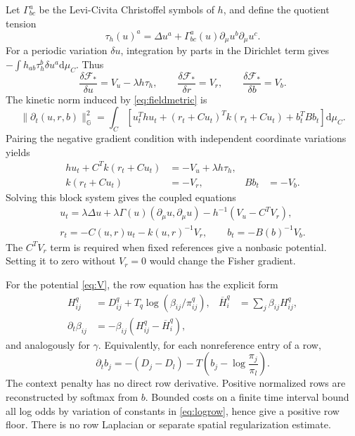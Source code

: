 \documentclass[11pt]{article}
\newcommand{\dd}{\mathrm d}
\begin{document}
Let $\Gamma^a_{bc}$ be the Levi-Civita Christoffel symbols of $h$, and define the quotient tension
\begin{equation}
 \tau_h(u)^a=\Delta u^a+
       \Gamma^a_{bc}(u)\partial_\mu u^b\partial_\mu u^c.
 \label{eq:tension}
\end{equation}
For a periodic variation $\delta u$, integration by parts in the Dirichlet term gives $-\int h_{ab}\tau_h^b\delta u^a\dd\mu_C$. Thus
\begin{equation}
 \frac{\delta\mathcal F_*}{\delta u}=V_u-\lambda h\tau_h,
 \qquad \frac{\delta\mathcal F_*}{\delta r}=V_r,
 \qquad \frac{\delta\mathcal F_*}{\delta b}=V_b.
 \label{eq:variations}
\end{equation}
The kinetic norm induced by \eqref{eq:fieldmetric} is
\begin{equation}
 \|\partial_t(u,r,b)\|_{\mathbb G}^2
 =\int_C\left[u_t^Thu_t+(r_t+Cu_t)^Tk(r_t+Cu_t)+b_t^TBb_t\right]\dd\mu_C.
 \label{eq:kinetic}
\end{equation}
Pairing the negative gradient condition with independent coordinate variations yields
\begin{align}
 hu_t+C^Tk(r_t+Cu_t)&=-V_u+\lambda h\tau_h,\\
 k(r_t+Cu_t)&=-V_r,& Bb_t&=-V_b.
\end{align}
Solving this block system gives the coupled equations
\begin{align}
 \boxed{u_t=\lambda\Delta u+
 \lambda\Gamma(u)(\partial_\mu u,\partial_\mu u)
       -h^{-1}(V_u-C^TV_r),}\label{eq:shape}\\
 \boxed{r_t=-C(u,r)u_t-k(u,r)^{-1}V_r,\qquad
 b_t=-B(b)^{-1}V_b.}\label{eq:fiber}
\end{align}
The $C^TV_r$ term is required when fixed references give a nonbasic potential. Setting it to zero without $V_r=0$ would change the Fisher gradient.

For the potential \eqref{eq:V}, the row equation has the explicit form
\begin{align}
 H^q_{ij}&=D^q_{ij}+T_q\log(\beta_{ij}/\pi^q_{ij}),&
 \overline H^q_i&=\sum_j\beta_{ij}H^q_{ij},\\
 \partial_t\beta_{ij}&=-\beta_{ij}(H^q_{ij}-\overline H^q_i),
 \label{eq:row}
\end{align}
and analogously for $\gamma$. Equivalently, for each nonreference entry of a row,
\begin{equation}
 \partial_t b_j=-(D_j-D_l)-T\left(b_j-\log\frac{\pi_j}{\pi_l}\right).
 \label{eq:logrow}
\end{equation}
The context penalty has no direct row derivative. Positive normalized rows are reconstructed by softmax from $b$. Bounded costs on a finite time interval bound all log odds by variation of constants in \eqref{eq:logrow}, hence give a positive row floor. There is no row Laplacian or separate spatial regularization estimate.
\end{document}
